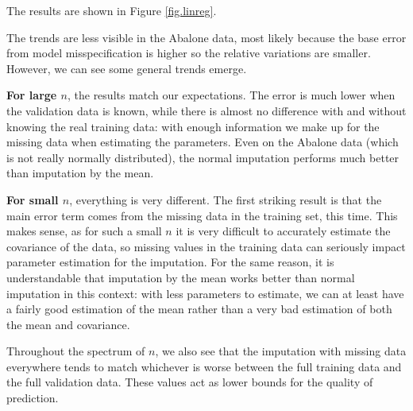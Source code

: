 The results are shown in Figure \ref{fig.linreg}. 



The trends are less visible in the Abalone data, most likely because the base error from model misspecification is higher so the relative variations are smaller. However, we can see some general trends emerge.

\textbf{For large $n$}, the results match our expectations. The error is much lower when the validation data is known, while there is almost no difference with and without knowing the real training data: with enough information we make up for the missing data when estimating the parameters. Even on the Abalone data (which is not really normally distributed), the normal imputation performs much better than imputation by the mean.

\textbf{For small $n$}, everything is very different. The first striking result is that the main error term comes from the missing data in the training set, this time. This makes sense, as for such a small $n$ it is very difficult to accurately estimate the covariance of the data, so missing values in the training data can seriously impact parameter estimation for the imputation. For the same reason, it is understandable that imputation by the mean works better than normal imputation in this context: with less parameters to estimate, we can at least have a fairly good estimation of the mean rather than a very bad estimation of both the mean and covariance. 

Throughout the spectrum of $n$, we also see that the imputation with missing data everywhere tends to match whichever is worse between the full training data and the full validation data. These values act as lower bounds for the quality of prediction.